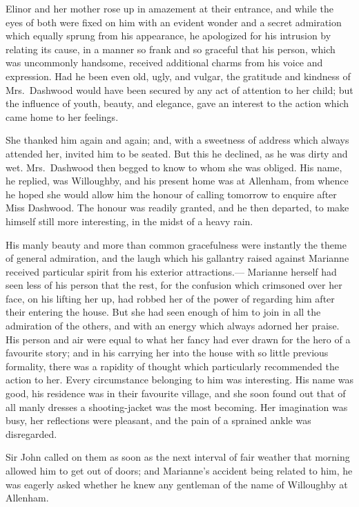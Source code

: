 \documentclass{article}
\begin{document}
Elinor and her mother rose up in amazement at
their entrance, and while the eyes of both were fixed
on him with an evident wonder and a secret admiration
which equally sprung from his appearance, he apologized
for his intrusion by relating its cause, in a manner
so frank and so graceful that his person, which was
uncommonly handsome, received additional charms from his voice
and expression.  Had he been even old, ugly, and vulgar,
the gratitude and kindness of Mrs.\ Dashwood would
have been secured by any act of attention to her child;
but the influence of youth, beauty, and elegance,
gave an interest to the action which came home to her feelings.

She thanked him again and again; and, with a sweetness
of address which always attended her, invited him to
be seated.  But this he declined, as he was dirty and wet.
Mrs.\ Dashwood then begged to know to whom she was obliged.
His name, he replied, was Willoughby, and his present
home was at Allenham, from whence he hoped she would
allow him the honour of calling tomorrow to enquire
after Miss Dashwood.  The honour was readily granted,
and he then departed, to make himself still more interesting,
in the midst of a heavy rain.

His manly beauty and more than common gracefulness
were instantly the theme of general admiration,
and the laugh which his gallantry raised against Marianne
received particular spirit from his exterior attractions.---%
Marianne herself had seen less of his person that the rest,
for the confusion which crimsoned over her face, on his
lifting her up, had robbed her of the power of regarding
him after their entering the house.  But she had seen
enough of him to join in all the admiration of the others,
and with an energy which always adorned her praise.
His person and air were equal to what her fancy had ever
drawn for the hero of a favourite story; and in his carrying
her into the house with so little previous formality, there
was a rapidity of thought which particularly recommended
the action to her.  Every circumstance belonging to him
was interesting.  His name was good, his residence was in
their favourite village, and she soon found out that of all
manly dresses a shooting-jacket was the most becoming.
Her imagination was busy, her reflections were pleasant,
and the pain of a sprained ankle was disregarded.

Sir John called on them as soon as the next interval
of fair weather that morning allowed him to get out
of doors; and Marianne's accident being related to him,
he was eagerly asked whether he knew any gentleman
of the name of Willoughby at Allenham.
\end{document}
